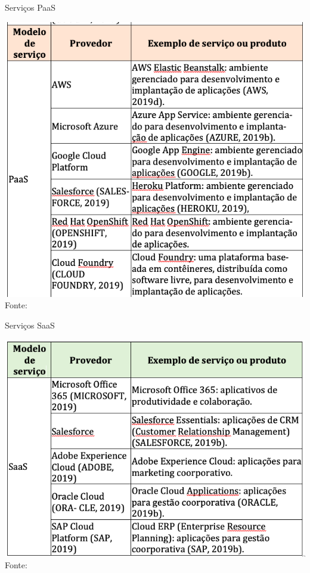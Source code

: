\documentclass{beamer}
\begin{document}
\begin{frame}{Serviços PaaS}

\begin{center}
	\includegraphics[width=0.75\paperheight]{fig/aula9/PaaS.png} \\
	Fonte: \cite{malheiros2019cc}
      \end{center}
    
\end{frame}
\begin{frame}{Serviços SaaS}

\begin{center}
	\includegraphics[height=0.6\paperheight]{fig/aula9/SaaS.png} \\
	Fonte: \cite{malheiros2019cc}
      \end{center}
    
\end{frame}
\end{document}
